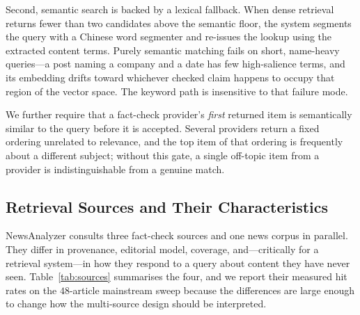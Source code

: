 \documentclass[twoside]{llncs}
\begin{document}
Second, semantic search is backed by a lexical fallback. When dense retrieval returns fewer than two candidates above the semantic floor, the system segments the query with a Chinese word segmenter and re-issues the lookup using the extracted content terms. Purely semantic matching fails on short, name-heavy queries---a post naming a company and a date has few high-salience terms, and its embedding drifts toward whichever checked claim happens to occupy that region of the vector space. The keyword path is insensitive to that failure mode.

We further require that a fact-check provider's \emph{first} returned item is semantically similar to the query before it is accepted. Several providers return a fixed ordering unrelated to relevance, and the top item of that ordering is frequently about a different subject; without this gate, a single off-topic item from a provider is indistinguishable from a genuine match.

\subsection{Retrieval Sources and Their Characteristics}
\label{sec:sources}
NewsAnalyzer consults three fact-check sources and one news corpus in parallel. They differ in provenance, editorial model, coverage, and---critically for a retrieval system---in how they respond to a query about content they have never seen. Table~\ref{tab:sources} summarises the four, and we report their measured hit rates on the $48$-article mainstream sweep because the differences are large enough to change how the multi-source design should be interpreted.
\end{document}
